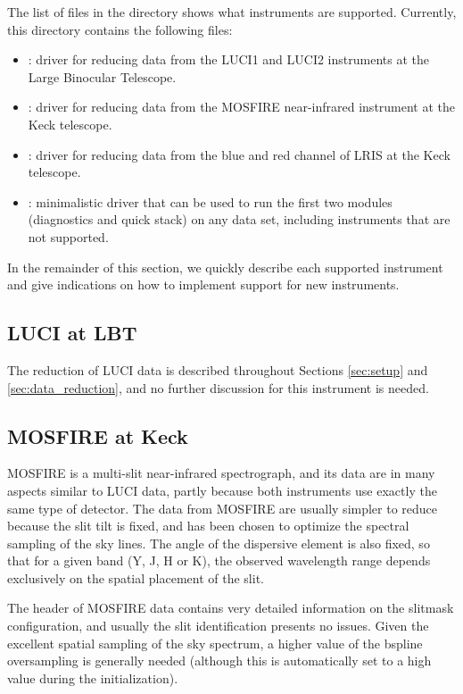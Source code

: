 \documentclass[a4paper]{article}
\begin{document}
\begin{sloppypar}
The list of files in the  directory shows what instruments are supported. Currently, this directory contains the following files:
\begin{itemize}
  \item[] : driver for reducing data from the LUCI1 and LUCI2 instruments at the Large Binocular Telescope.
  \item[] : driver for reducing data from the MOSFIRE near-infrared instrument at the Keck telescope.
  \item[] : driver for reducing data from the blue and red channel of LRIS at the Keck telescope.
  \item[] : minimalistic driver that can be used to run the first two modules (diagnostics and quick stack) on any data set, including instruments that are not supported.
\end{itemize}

In the remainder of this section, we quickly describe each supported instrument and give indications on how to implement support for new instruments.


\subsection{LUCI at LBT}

The reduction of LUCI data is described throughout Sections \ref{sec:setup} and \ref{sec:data_reduction}, and no further discussion for this instrument is needed.


\subsection{MOSFIRE at Keck}

MOSFIRE is a multi-slit near-infrared spectrograph, and its data are in many aspects similar to LUCI data, partly because both instruments use exactly the same type of detector. The data from MOSFIRE are usually simpler to reduce because the slit tilt is fixed, and has been chosen to optimize the spectral sampling of the sky lines. The angle of the dispersive element is also fixed, so that for a given band (Y, J, H or K), the observed wavelength range depends exclusively on the spatial placement of the slit.

The header of MOSFIRE data contains very detailed information on the slitmask configuration, and usually the slit identification presents no issues. Given the excellent spatial sampling of the sky spectrum, a higher value of the bspline oversampling is generally needed (although this is automatically set to a high value during the initialization).


\end{sloppypar}
\end{document}
